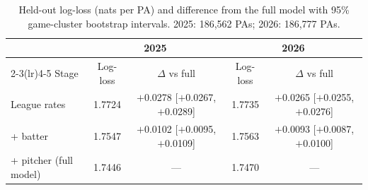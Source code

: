 \begin{table}[t]\centering\small
\caption{Held-out log-loss (nats per PA) and difference from the full model with 95\% game-cluster bootstrap intervals. 2025: 186,562 PAs; 2026: 186,777 PAs.}\label{tab:e2}
\begin{tabular}{lcccc}\toprule
 & \multicolumn{2}{c}{2025} & \multicolumn{2}{c}{2026}\\
\cmidrule(lr){2-3}\cmidrule(lr){4-5}
Stage & Log-loss & $\Delta$ vs full & Log-loss & $\Delta$ vs full\\ \midrule
League rates & 1.7724 & $+$0.0278 [$+$0.0267, $+$0.0289] & 1.7735 & $+$0.0265 [$+$0.0255, $+$0.0276] \\
+ batter & 1.7547 & $+$0.0102 [$+$0.0095, $+$0.0109] & 1.7563 & $+$0.0093 [$+$0.0087, $+$0.0100] \\
+ pitcher (full model) & 1.7446 & --- & 1.7470 & --- \\
\bottomrule\end{tabular}\end{table}
